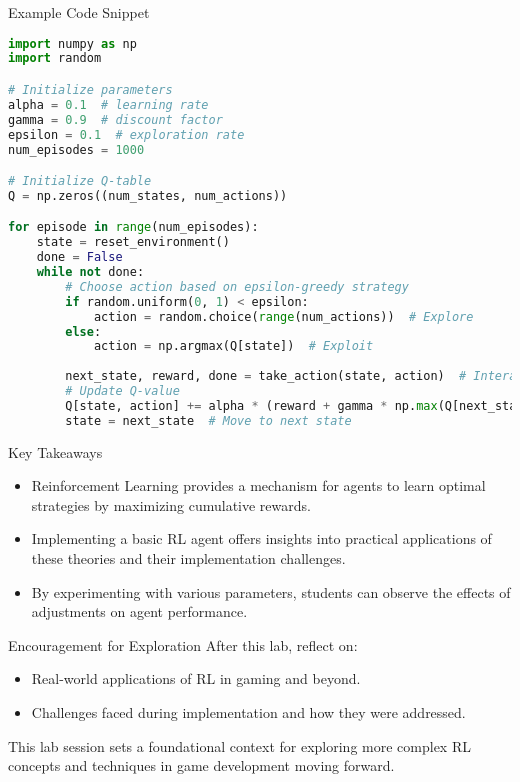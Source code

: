 \documentclass[aspectratio=169]{beamer}
\begin{document}
\begin{frame}[fragile]{Example Code Snippet}
\begin{lstlisting}[language=Python]
import numpy as np
import random

# Initialize parameters
alpha = 0.1  # learning rate
gamma = 0.9  # discount factor
epsilon = 0.1  # exploration rate
num_episodes = 1000

# Initialize Q-table
Q = np.zeros((num_states, num_actions))

for episode in range(num_episodes):
    state = reset_environment()
    done = False
    while not done:
        # Choose action based on epsilon-greedy strategy
        if random.uniform(0, 1) < epsilon:
            action = random.choice(range(num_actions))  # Explore
        else:
            action = np.argmax(Q[state])  # Exploit
        
        next_state, reward, done = take_action(state, action)  # Interact with environment
        # Update Q-value
        Q[state, action] += alpha * (reward + gamma * np.max(Q[next_state]) - Q[state, action])
        state = next_state  # Move to next state
\end{lstlisting}
\end{frame}

\begin{frame}{Key Takeaways}
    \begin{itemize}
        \item Reinforcement Learning provides a mechanism for agents to learn optimal strategies by maximizing cumulative rewards.
        \item Implementing a basic RL agent offers insights into practical applications of these theories and their implementation challenges.
        \item By experimenting with various parameters, students can observe the effects of adjustments on agent performance.
    \end{itemize}
\end{frame}

\begin{frame}{Encouragement for Exploration}
    After this lab, reflect on:
    \begin{itemize}
        \item Real-world applications of RL in gaming and beyond.
        \item Challenges faced during implementation and how they were addressed.
    \end{itemize}
    This lab session sets a foundational context for exploring more complex RL concepts and techniques in game development moving forward.
\end{frame}
\end{document}
